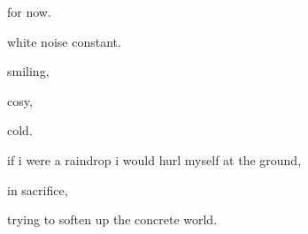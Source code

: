 \documentclass[extrafontsizes, 48pt]{memoir}
\newcommand\blankpage{%
    \null
    \thispagestyle{empty}%
    \addtocounter{page}{-1}%
    \newpage}
\begin{document}
	\begin{minipage}{.6\textwidth}
	for now.
	\afterpage{\blankpage}
	\end{minipage}
	\newpage

	\begin{minipage}{.6\textwidth}
	white noise constant.
	\end{minipage}
	\newpage

	\begin{minipage}{.6\textwidth}
	smiling, 
	\end{minipage}
	\newpage

	\begin{minipage}{.6\textwidth}
	cosy,
	\end{minipage}
	\newpage

	\begin{minipage}{.6\textwidth}
	cold.
	\afterpage{\blankpage}
	\end{minipage}
	\newpage

	\begin{minipage}{.6\textwidth}
	if i were a raindrop i would hurl myself at the ground,
	\end{minipage}
	\newpage

	\begin{minipage}{.6\textwidth}
	in sacrifice,
	\end{minipage}
	\newpage

	\begin{minipage}{.6\textwidth}
	trying to soften up the concrete world.
	\afterpage{\blankpage}
	\end{minipage}
	\newpage
\end{document}
